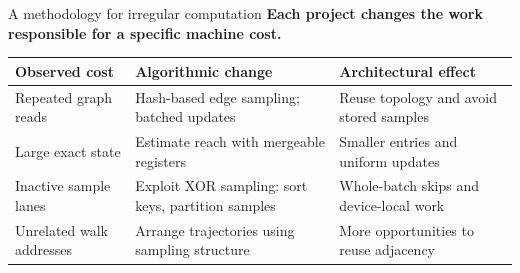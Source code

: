 \documentclass[10pt,aspectratio=169]{beamer}
\begin{document}
\begin{frame}{A methodology for irregular computation}
\setlength{\parskip}{0pt}
\textbf{Each project changes the work responsible for a specific machine cost.}\par
\vspace{0.25cm}
{\small\renewcommand{\arraystretch}{1.25}
\begin{tabular}{@{}>{\raggedright\arraybackslash}p{3.6cm}>{\raggedright\arraybackslash}p{5.2cm}>{\raggedright\arraybackslash}p{4.8cm}@{}}
\toprule\textbf{Observed cost} & \textbf{Algorithmic change} & \textbf{Architectural effect}\\\midrule
Repeated graph reads & Hash-based edge sampling; batched updates & Reuse topology and avoid stored samples\\
Large exact state & Estimate reach with mergeable registers & Smaller entries and uniform updates\\
Inactive sample lanes & Exploit XOR sampling: sort keys, partition samples & Whole-batch skips and device-local work\\
Unrelated walk addresses & Arrange trajectories using sampling structure & More opportunities to reuse adjacency\\\bottomrule
\end{tabular}\par}
\end{frame}
\end{document}

